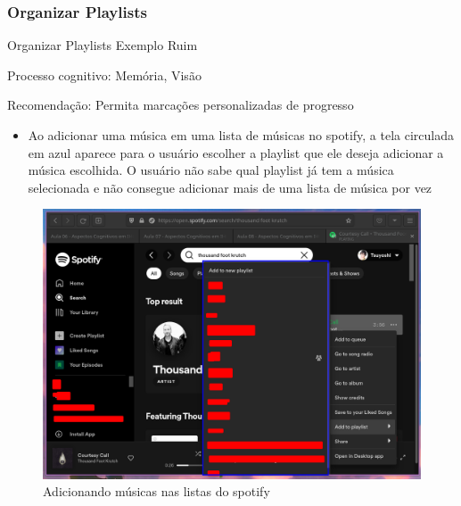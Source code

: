 \documentclass{beamer}
\begin{document}
\subsubsection{Organizar Playlists}
\begin{frame}{Organizar Playlists Exemplo Ruim}

Processo cognitivo: Memória, Visão

Recomendação: Permita marcações personalizadas de progresso

\begin{itemize}
    \item  Ao adicionar uma música em uma lista de músicas no spotify, a tela circulada em azul aparece para o usuário escolher a playlist que ele deseja adicionar a música escolhida. O usuário não sabe qual playlist já tem a música selecionada e não consegue adicionar mais de uma lista de música por vez
\end{itemize}
\begin{figure}
    \centering
    \includegraphics[scale=0.15]{images/spotify-playlist.png}
    \caption{Adicionando músicas nas listas do spotify}
\end{figure}

\end{frame}
\end{document}
